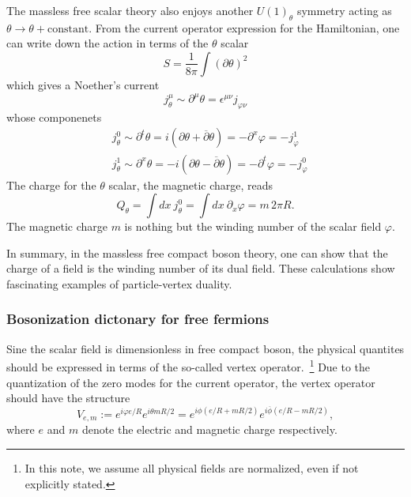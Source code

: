 The massless free scalar theory also enjoys another ${U(1)}_\theta$ symmetry acting as $\theta \rightarrow \theta + \mathrm{constant}$. From the current operator expression for the Hamiltonian, one can write down the action in terms of the $\theta$ scalar
\begin{equation}
	S = \frac{1}{8\pi}\int {\left(\partial \theta\right)}^2
\end{equation}
which gives a Noether's current
\begin{equation}
	j^\mu_\theta \sim \partial^\mu \theta = \epsilon^{\mu\nu}j_{\varphi\nu}
\end{equation}
whose componenets
\begin{equation}
	\begin{aligned}
		&j^0_\theta \sim \partial^t\theta = i \left(\partial \theta + \overline{\partial} {\theta}\right) = -\partial^x \varphi = -j^1_\varphi\\
		&j^1_\theta \sim \partial^x\theta = -i\left( \partial \theta - \overline{\partial}\theta \right) = -\partial^t \varphi = -j^0_\varphi
	\end{aligned}
\end{equation}
The charge for the $\theta$ scalar, the magnetic charge, reads
\begin{equation}
	Q_\theta = \int dx \ j^0_\theta = \int dx \ \partial_x \varphi = m\,2\pi R.
\end{equation}
The magnetic charge $m$ is nothing but the winding number of the scalar field $\varphi$.

In summary, in the massless free compact boson theory, one can show that the charge of a field is the winding number of its dual field. These calculations show fascinating examples of particle-vertex duality. 


\subsubsection{Bosonization dictonary for free fermions}
Sine the scalar field is dimensionless in free compact boson, the physical quantites should be expressed in terms of the so-called vertex operator.~\footnote{In this note, we assume all physical fields are normalized, even if not explicitly stated.} Due to the quantization of the zero modes for the current operator, the vertex operator should have the structure 
\begin{equation}
	V_{e,m} := e^{i \varphi e/R} e^{i\theta m R/2} = e^{i\phi \left(e/R + mR/2\right)} e^{i\overline{\phi} \left(e/R - mR/2\right)},	
\end{equation}
where $e$ and $m$ denote the electric and magnetic charge respectively.


